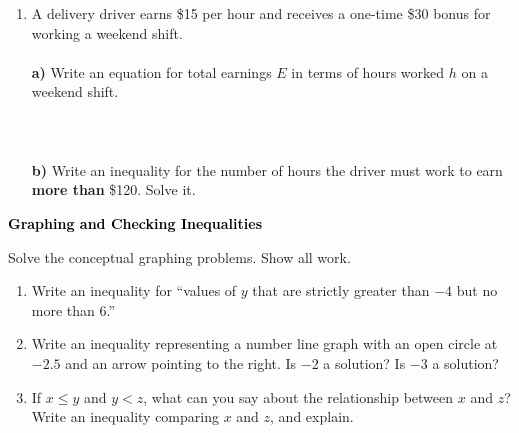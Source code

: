 \documentclass[12pt, letterpaper, fleqn]{article}
\newcommand{\blanklong}{\underline{\hspace{6.5cm}}}
\begin{document}
\begin{enumerate}[itemsep=1.5cm, leftmargin=0.6cm]
\vspace{2cm}

\item A delivery driver earns \$15 per hour and receives a one-time \$30 bonus for working a weekend shift. \\ \\
\textbf{a)} Write an equation for total earnings $E$ in terms of hours worked $h$ on a weekend shift. \\ \\ \blanklong \\ \\
\textbf{b)} Write an inequality for the number of hours the driver must work to earn \textbf{more than} \$120. Solve it.

\vspace{2cm}

\end{enumerate}

\newpage

\begin{tcolorbox}[colback=black!10]
\large\textcolor{black}{\textbf{Graphing and Checking Inequalities}}
\end{tcolorbox}

\noindent
Solve the conceptual graphing problems. Show all work.

\vspace{3mm}

\begin{enumerate}[itemsep=2.2cm, leftmargin=0.6cm]

\item Write an inequality for ``values of $y$ that are strictly greater than $-4$ but no more than 6.''

\vspace{2cm}

\item Write an inequality representing a number line graph with an open circle at $-2.5$ and an arrow pointing to the right. Is $-2$ a solution? Is $-3$ a solution?

\vspace{2cm}

\item If $x \le y$ and $y < z$, what can you say about the relationship between $x$ and $z$? Write an inequality comparing $x$ and $z$, and explain.

\vspace{2cm}

\end{enumerate}
\end{document}
